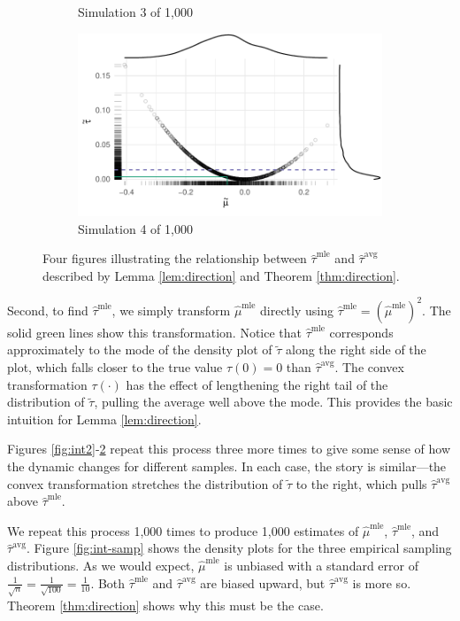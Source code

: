 \documentclass[11pt]{article}
\begin{document}
\begin{figure}
\begin{subfigure}{.5\textwidth}
  \caption{Simulation 3 of 1,000}
  \label{fig:int3}
\end{subfigure}%
\begin{subfigure}{.5\textwidth}
  \centering
  \includegraphics[width=.85\linewidth]{figs/intuition-4.pdf}
  \caption{Simulation 4 of 1,000}
  \label{fig:int4}
\end{subfigure}

\vspace{.1in}
\caption{Four figures illustrating the relationship between $\hat{\tau}^\text{mle}$ and $\hat{\tau}^\text{avg}$ described by Lemma \ref{lem:direction} and Theorem \ref{thm:direction}.}
\label{fig:int}
\end{figure}

Second, to find $\hat{\tau}^\text{mle}$, we simply transform $\hat{\mu}^\text{mle}$ directly using $\hat{\tau}^\text{mle} = \left( \hat{\mu}^\text{mle} \right) ^2$.
The solid green lines show this transformation.
Notice that $\hat{\tau}^\text{mle}$ corresponds approximately to the mode of the density plot of $\tilde{\tau}$ along the right side of the plot, which falls closer to the true value $\tau(0) = 0$ than $\hat{\tau}^\text{avg}$.
The convex transformation $\tau(\cdot)$ has the effect of lengthening the right tail of the distribution of $\tilde{\tau}$, pulling the average well above the mode.
This provides the basic intuition for Lemma \ref{lem:direction}.

Figures \ref{fig:int2}-\ref{fig:int4} repeat this process three more times to give some sense of how the dynamic changes for different samples.
In each case, the story is similar---the convex transformation stretches the distribution of $\tilde{\tau}$ to the right, which pulls $\hat{\tau}^\text{avg}$ above $\hat{\tau}^\text{mle}$.

We repeat this process 1,000 times to produce 1,000 estimates of $\hat{\mu}^\text{mle}$, $\hat{\tau}^\text{mle}$, and $\hat{\tau}^\text{avg}$.
Figure \ref{fig:int-samp} shows the density plots for the three empirical sampling distributions.
As we would expect, $\hat{\mu}^\text{mle}$ is unbiased with a standard error of $\frac{1}{\sqrt{n}} = \frac{1}{\sqrt{100}} = \frac{1}{10}$.
Both $\hat{\tau}^\text{mle}$ and $\hat{\tau}^\text{avg}$ are biased upward, but $\hat{\tau}^\text{avg}$ is more so.
Theorem \ref{thm:direction} shows why this must be the case.
\end{document}

